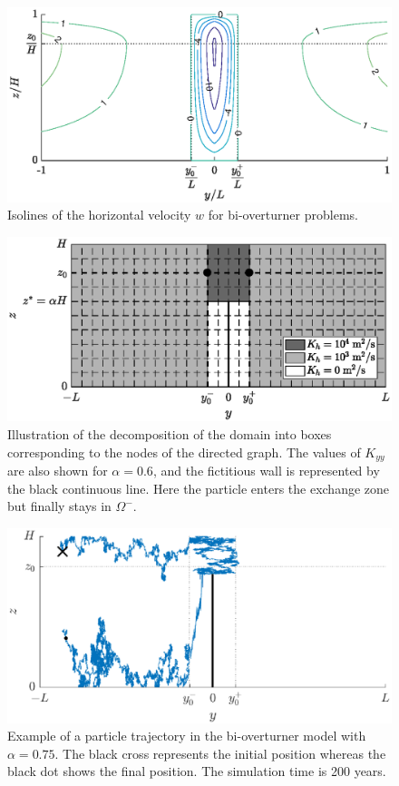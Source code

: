 \begin{figure}[!htp]
	\centering
	\includegraphics[width=\textwidth]{fig/problem2box/w2box_timmermans.eps}
	\caption{Isolines of the horizontal velocity $w$ for bi-overturner problems.}
	\label{fig:w2box}
\end{figure}

\begin{figure}[!htp]
	\centering
	\includegraphics[width=\textwidth]{fig/problem2box/problem.eps}
	\caption{Illustration of the decomposition of the domain into boxes corresponding to the nodes of the directed graph. The values of $K_{yy}$ are also shown for $\alpha = 0.6$, and the fictitious wall is represented by the black continuous line. Here the particle enters the exchange zone but finally stays in $\Omega^-$.}
	\label{fig:Kh2box}
\end{figure}

\begin{figure}[!htp]
	\centering
	\includegraphics[width=\textwidth]{fig/problem2box/traj_without_transfer5.eps}
	\caption{Example of a particle trajectory in the bi-overturner model with $\alpha = 0.75$. The black cross represents the initial position whereas the black dot shows the final position. The simulation time is 200 years.}
	\label{fig:withouttransfer}
\end{figure}

